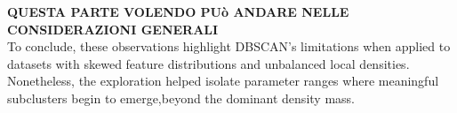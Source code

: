 \textbf{QUESTA PARTE VOLENDO PUò ANDARE NELLE CONSIDERAZIONI GENERALI}\\
To conclude, these observations highlight DBSCAN's limitations when applied to datasets with skewed feature distributions and unbalanced local densities.
Nonetheless, the exploration helped isolate parameter ranges where meaningful subclusters begin to emerge,beyond the dominant density mass.











